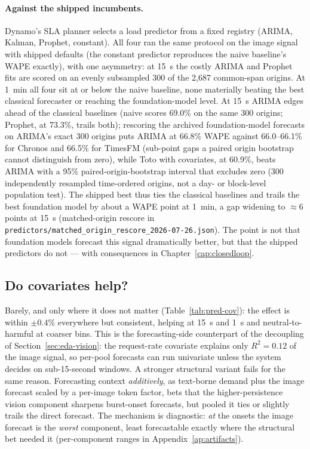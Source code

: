\paragraph{Against the shipped incumbents.} Dynamo's SLA planner selects a
load predictor from a fixed registry (ARIMA, Kalman, Prophet, constant).
All four ran the same protocol on the image signal with shipped defaults
(the constant predictor reproduces the naive baseline's WAPE exactly),
with one asymmetry: at \SI{15}{\second} the costly ARIMA and Prophet fits
are scored on an evenly subsampled 300 of the 2{,}687 common-span origins. At
\SI{1}{\minute} all four sit at or below the naive baseline, none
materially beating the best classical forecaster or reaching the
foundation-model level. At \SI{15}{\second} ARIMA edges ahead of the
classical baselines (naive scores 69.0\% on the same 300 origins; Prophet,
at 73.3\%, trails both); rescoring the archived foundation-model forecasts
on ARIMA's exact 300 origins puts ARIMA at 66.8\% WAPE against
66.0--66.1\% for Chronos and 66.5\% for TimesFM (sub-point gaps a paired
origin bootstrap cannot distinguish from zero), while Toto with
covariates, at 60.9\%, beats ARIMA with a 95\% paired-origin-bootstrap
interval that excludes zero (300 independently resampled time-ordered
origins, not a day- or block-level population test).
The shipped best thus ties the classical baselines and trails the best
foundation model by about a WAPE point at \SI{1}{\minute}, a gap widening to
${\approx}6$ points at \SI{15}{\second} (matched-origin rescore in
\texttt{predictors/matched\_origin\_rescore\_2026-07-26.json}). The point
is not that foundation models forecast this signal dramatically better, but
that the shipped predictors do not --- with consequences in
Chapter~\ref{cap:closedloop}.

\subsection{Do covariates help?}
\label{sec:pred-covariates}

Barely, and only where it does not matter (Table~\ref{tab:pred-cov}): the
effect is within $\pm0.4\%$ everywhere but consistent, helping at
\SI{15}{\second} and \SI{1}{\second} and neutral-to-harmful at coarser
bins. This is the forecasting-side counterpart of the decoupling of
Section~\ref{sec:eda-vision}: the request-rate covariate explains only
$R^2{=}0.12$ of the image signal, so per-pool forecasts can run
univariate unless the system decides on sub-15-second windows. A stronger
structural variant fails for the same reason. Forecasting context
\emph{additively}, as text-borne demand plus the image forecast scaled by a
per-image token factor, bets that the higher-persistence vision component
sharpens burst-onset forecasts, but pooled it ties or slightly trails the
direct forecast. The mechanism is diagnostic: \emph{at} the onsets
the image forecast is the \emph{worst} component, least forecastable
exactly where the structural bet needed it (per-component ranges in
Appendix~\ref{ap:artifacts}).

